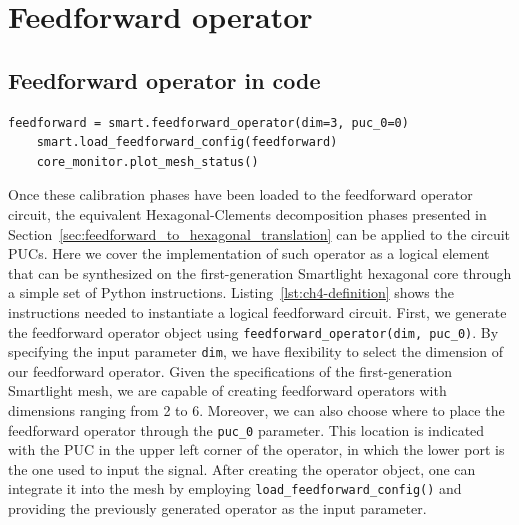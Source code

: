 
\section{Feedforward operator}\label{sec:feedforward_operator} %

\subsection{Feedforward operator in code}\label{sub:feedforward_operator_in_code} %

\begin{lstlisting}[caption={A 3x3 Feedforward operator instance in hexagonal mesh}, label={lst:ch4-definition}]
	feedforward = smart.feedforward_operator(dim=3, puc_0=0)
	smart.load_feedforward_config(feedforward)
	core_monitor.plot_mesh_status()
\end{lstlisting}

Once these calibration phases have been loaded to the feedforward operator circuit, the equivalent Hexagonal-Clements decomposition phases presented in Section~\ref{sec:feedforward_to_hexagonal_translation} can be applied to the circuit PUCs.
Here we cover the implementation of such operator as a logical element that can be synthesized on the first-generation Smartlight hexagonal core through a simple set of Python instructions.
Listing~\ref{lst:ch4-definition} shows the instructions needed to instantiate a logical feedforward circuit.
First, we generate the feedforward operator object using \lstinline|feedforward_operator(dim, puc_0)|.
By specifying the input parameter \lstinline|dim|, we have flexibility to select the dimension of our feedforward operator.
Given the specifications of the first-generation Smartlight mesh, we are capable of creating feedforward operators with dimensions ranging from 2 to 6.
Moreover, we can also choose where to place the feedforward operator through the \lstinline|puc_0| parameter.
This location is indicated with the PUC in the upper left corner of the operator, in which the lower port is the one used to input the signal.
After creating the operator object, one can integrate it into the mesh by employing \lstinline|load_feedforward_config()| and providing the previously generated operator as the input parameter.

